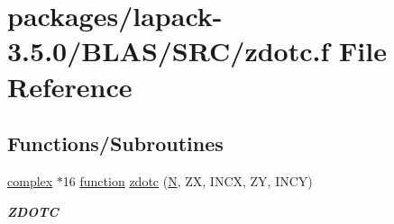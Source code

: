 \hypertarget{lapack-3_85_80_2BLAS_2SRC_2zdotc_8f}{}\section{packages/lapack-\/3.5.0/\+B\+L\+A\+S/\+S\+R\+C/zdotc.f File Reference}
\label{lapack-3_85_80_2BLAS_2SRC_2zdotc_8f}
\subsection*{Functions/\+Subroutines}
\begin{DoxyCompactItemize}
\item 
\hyperlink{structcomplex}{complex} $\ast$16 \hyperlink{afunc_8m_a7b5e596df91eadea6c537c0825e894a7}{function} \hyperlink{group__complex16__blas__level1_ga45b00bad9285ff50cd86e97dfb04facd}{zdotc} (\hyperlink{polmisc_8c_a0240ac851181b84ac374872dc5434ee4}{N}, Z\+X, I\+N\+C\+X, Z\+Y, I\+N\+C\+Y)
\begin{DoxyCompactList}\small\item\em {\bfseries Z\+D\+O\+T\+C} \end{DoxyCompactList}\end{DoxyCompactItemize}
